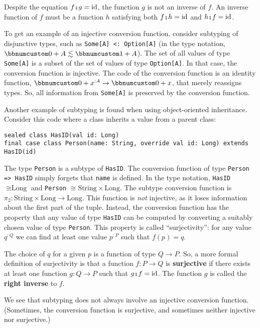 Despite the equation $f\bef g=\text{id}$, the function $g$ is not
an inverse of $f$. An inverse function of
$f$ must be a function $h$ satisfying both $f\bef h=\text{id}$
and $h\bef f=\text{id}$.

To get an example of an injective conversion function, consider subtyping
of disjunctive types, such as \lstinline!Some[A] <: Option[A]! (in
the type notation, $\bbnum 0+A\lesssim\bbnum 1+A$). The set of all
values of type \lstinline!Some[A]! is a subset of the set of values
of type \lstinline!Option[A]!. In that case, the conversion function
is injective. The code of the conversion function is an identity function,
$\bbnum 0+x^{:A}\rightarrow\bbnum 0+x$, that merely reassigns types.
So, all information from \lstinline!Some[A]! is preserved by the
conversion function.

Another example of subtyping is found when using object-oriented inheritance.
Consider this code where a class inherits a value from a parent class:
\begin{lstlisting}
sealed class HasID(val id: Long)
final case class Person(name: String, override val id: Long) extends HasID(id)
\end{lstlisting}
The type \lstinline!Person! is a subtype of \lstinline!HasID!. The
conversion function of type \lstinline!Person => HasID! simply forgets
that \lstinline!name! is defined. In the type notation, \lstinline!HasID!
$\cong\text{Long}$ and \lstinline!Person! $\cong\text{String}\times\text{Long}$.
The subtype conversion function is $\pi_{2}:\text{String}\times\text{Long}\rightarrow\text{Long}$.
This function is \emph{not} injective, as it loses information about
the first part of the tuple. Instead, the conversion function has
the property that any value of type \lstinline!HasID! can be computed
by converting a suitably chosen value of type \lstinline!Person!.
This property is called \textsf{``}surjectivity\textsf{''}: for any value $q^{:Q}$
we can find at least one value $p^{:P}$ such that $f(p)=q$. 

The choice of $q$ for a given $p$ is a function of type $Q\rightarrow P$.
So, a more formal definition of surjectivity is that a function $f:P\rightarrow Q$
is \textbf{surjective} if there exists
at least one function $g:Q\rightarrow P$ such that $g\bef f=\text{id}$.
The function $g$ is called the \textbf{right
inverse} to $f$.

We see that subtyping does not always involve an injective conversion
function. (Sometimes, the conversion function is surjective, and sometimes
neither injective nor surjective.)

